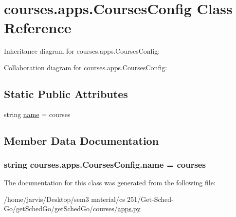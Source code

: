\hypertarget{classcourses_1_1apps_1_1CoursesConfig}{}\section{courses.\+apps.\+Courses\+Config Class Reference}
\label{classcourses_1_1apps_1_1CoursesConfig}


Inheritance diagram for courses.\+apps.\+Courses\+Config\+:


Collaboration diagram for courses.\+apps.\+Courses\+Config\+:
\subsection*{Static Public Attributes}
\begin{DoxyCompactItemize}
\item 
string \hyperlink{classcourses_1_1apps_1_1CoursesConfig_aa9d8ba01b9ecf36c212bb500e42e2fc9}{name} = \textquotesingle{}courses\textquotesingle{}
\end{DoxyCompactItemize}


\subsection{Member Data Documentation}
\subsubsection[{\texorpdfstring{name}{name}}]{\setlength{\rightskip}{0pt plus 5cm}string courses.\+apps.\+Courses\+Config.\+name = \textquotesingle{}courses\textquotesingle{}\hspace{0.3cm}{\ttfamily [static]}}\hypertarget{classcourses_1_1apps_1_1CoursesConfig_aa9d8ba01b9ecf36c212bb500e42e2fc9}{}\label{classcourses_1_1apps_1_1CoursesConfig_aa9d8ba01b9ecf36c212bb500e42e2fc9}


The documentation for this class was generated from the following file\+:\begin{DoxyCompactItemize}
\item 
/home/jarvis/\+Desktop/sem3 material/cs 251/\+Get-\/\+Sched-\/\+Go/get\+Sched\+Go/get\+Sched\+Go/courses/\hyperlink{courses_2apps_8py}{apps.\+py}\end{DoxyCompactItemize}
